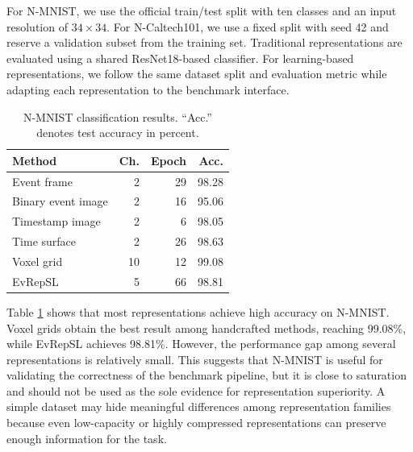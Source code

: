 \documentclass[letterpaper]{article}
\begin{document}
For N-MNIST, we use the official train/test split with ten classes and an input resolution of $34\times34$. For N-Caltech101, we use a fixed split with seed 42 and reserve a validation subset from the training set. Traditional representations are evaluated using a shared ResNet18-based classifier. For learning-based representations, we follow the same dataset split and evaluation metric while adapting each representation to the benchmark interface.

\begin{table}[htbp]
\centering
\begin{tabular}{l|r|r|r}
Method & Ch. & Epoch & Acc. \\
\hline
Event frame & 2 & 29 & 98.28 \\
Binary event image & 2 & 16 & 95.06 \\
Timestamp image & 2 & 6 & 98.05 \\
Time surface & 2 & 26 & 98.63 \\
Voxel grid & 10 & 12 & 99.08 \\
EvRepSL & 5 & 66 & 98.81 \\
\end{tabular}
\caption{N-MNIST classification results. ``Acc.'' denotes test accuracy in percent.}
\label{tab:nmnist}
\end{table}

Table \ref{tab:nmnist} shows that most representations achieve high accuracy on N-MNIST. Voxel grids obtain the best result among handcrafted methods, reaching 99.08\%, while EvRepSL achieves 98.81\%. However, the performance gap among several representations is relatively small. This suggests that N-MNIST is useful for validating the correctness of the benchmark pipeline, but it is close to saturation and should not be used as the sole evidence for representation superiority. A simple dataset may hide meaningful differences among representation families because even low-capacity or highly compressed representations can preserve enough information for the task.
\end{document}
